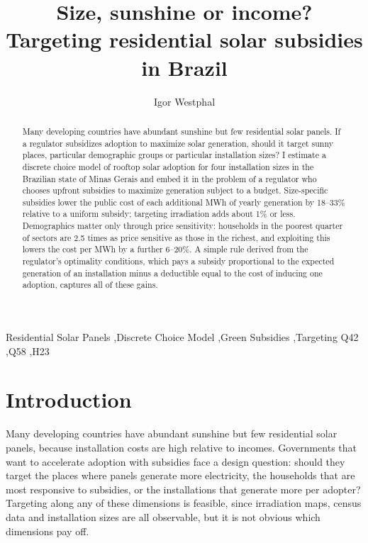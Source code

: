\documentclass[final,3p,times,authoryear]{elsarticle}
\begin{document}
\begin{frontmatter}

\title{Size, sunshine or income? Targeting residential solar subsidies in Brazil}

\author[inst1]{Igor Westphal}

\begin{abstract}
Many developing countries have abundant sunshine but few residential solar panels. If a regulator subsidizes adoption to maximize solar generation, should it target sunny places, particular demographic groups or particular installation sizes? I estimate a discrete choice model of rooftop solar adoption for four installation sizes in the Brazilian state of Minas Gerais and embed it in the problem of a regulator who chooses upfront subsidies to maximize generation subject to a budget. Size-specific subsidies lower the public cost of each additional MWh of yearly generation by 18--33\% relative to a uniform subsidy; targeting irradiation adds about 1\% or less. Demographics matter only through price sensitivity: households in the poorest quarter of sectors are 2.5 times as price sensitive as those in the richest, and exploiting this lowers the cost per MWh by a further 6--20\%. A simple rule derived from the regulator's optimality conditions, which pays a subsidy proportional to the expected generation of an installation minus a deductible equal to the cost of inducing one adoption, captures all of these gains.
\end{abstract}

\begin{keyword}
Residential Solar Panels \sep Discrete Choice Model \sep Green Subsidies \sep Targeting
\JEL Q42 \sep Q58 \sep H23
\end{keyword}

\end{frontmatter}

\section{Introduction}
\label{Introduction}

    Many developing countries have abundant sunshine but few residential solar panels, because installation costs are high relative to incomes. Governments that want to accelerate adoption with subsidies face a design question: should they target the places where panels generate more electricity, the households that are most responsive to subsidies, or the installations that generate more per adopter? Targeting along any of these dimensions is feasible, since irradiation maps, census data and installation sizes are all observable, but it is not obvious which dimensions pay off.
\end{document}
